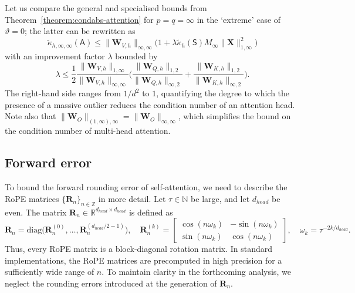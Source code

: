 \documentclass[namedate,webpdf,imanum]{ima-authoring-template}
\newcommand{\Real}{\mathbb{R}}
\newcommand{\N}{\mathbb{N}}
\newcommand{\Z}{\mathbb{Z}}
\newcommand{\Matrix}[1]{\mathbf{#1}}
\newcommand{\diag}[2][]{\mathrm{diag}#1( #2 #1)}
\newcommand{\Norm}[3][]{#1\| #2 #1\|_{\mathrm{#3}}}
\newcommand{\Layer}[1]{\mathsf{#1}}
\numberwithin{equation}{section}
\begin{document}
Let us compare the general and specialised bounds from Theorem~\ref{theorem:condabs-attention} for $p = q = \infty$ in the `extreme' case of $\vartheta = 0$; the latter can be rewritten as
\begin{equation*}
    \tilde{\kappa}_{h,\infty,\infty}(\Layer{A}) \leq \Norm{\Matrix{W}_{V,h}}{\infty,\infty} \Big( 1 + \lambda \tilde{\kappa}_{h}(\Layer{S}) M_{\infty} \Norm{\Matrix{X}}{1,\infty}^2 \Big)
\end{equation*}
with an improvement factor $\lambda$ bounded by
\begin{equation*}
    \lambda \leq \frac{1}{2} \frac{\Norm{\Matrix{W}_{V,h}}{1,\infty}}{\Norm{\Matrix{W}_{V,h}}{\infty,\infty}} \bigg( \frac{\Norm{\Matrix{W}_{Q,h}}{1,2}}{\Norm{\Matrix{W}_{Q,h}}{\infty,2}} + \frac{\Norm{\Matrix{W}_{K,h}}{1,2}}{\Norm{\Matrix{W}_{K,h}}{\infty,2}} \bigg).
\end{equation*}
The right-hand side ranges from $1 / d^2$ to $1$, quantifying the degree to which the presence of a massive outlier reduces the condition number of an attention head.
Note also that $\Norm{\Matrix{W}_O}{(1,\infty),\infty} = \Norm{\Matrix{W}_O}{\infty,\infty}$, which simplifies the bound on the condition number of multi-head attention.

\subsection{Forward error}
To bound the forward rounding error of self-attention, we need to describe the RoPE matrices $\{ \Matrix{R}_{n} \}_{n \in \Z}$ in more detail.
Let $\tau \in \N$ be large, and let $d_{head}$ be even.
The matrix $\Matrix{R}_n \in \Real^{d_{head} \times d_{head}}$ is defined as
\begin{equation*}
    \Matrix{R}_n = \diag[\Big]{\Matrix{R}_n^{(0)}, \ldots, \Matrix{R}_n^{(d_{head}/2-1)}}, \quad \Matrix{R}_n^{(k)} = \begin{bmatrix}
        \cos(n \omega_k) & -\sin(n \omega_k) \\
        \sin(n \omega_k) &  \cos(n \omega_k)
    \end{bmatrix}, \quad \omega_k = \tau^{-2k/d_{head}}.
\end{equation*}
Thus, every RoPE matrix is a block-diagonal rotation matrix.
In standard implementations, the RoPE matrices are precomputed in high precision for a sufficiently wide range of $n$.
To maintain clarity in the forthcoming analysis, we neglect the rounding errors introduced at the generation of $\Matrix{R}_n$.
\end{document}
